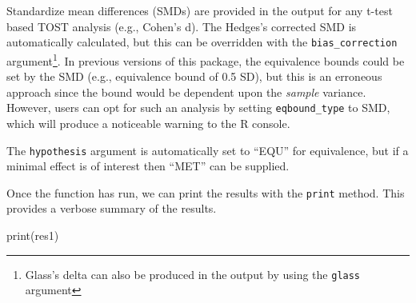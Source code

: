 \documentclass[]{interact}
\theoremstyle{plain}%
\theoremstyle{definition}
\theoremstyle{remark}
\newenvironment{Shaded}{\begin{snugshade}}{\end{snugshade}}
\newcommand{\AttributeTok}[1]{\textcolor[rgb]{0.77,0.63,0.00}{#1}}
\newcommand{\CommentTok}[1]{\textcolor[rgb]{0.56,0.35,0.01}{\textit{#1}}}
\newcommand{\DecValTok}[1]{\textcolor[rgb]{0.00,0.00,0.81}{#1}}
\newcommand{\FunctionTok}[1]{\textcolor[rgb]{0.00,0.00,0.00}{#1}}
\newcommand{\NormalTok}[1]{#1}
\newcommand{\OtherTok}[1]{\textcolor[rgb]{0.56,0.35,0.01}{#1}}
\newcommand{\SpecialCharTok}[1]{\textcolor[rgb]{0.00,0.00,0.00}{#1}}
\newcommand{\StringTok}[1]{\textcolor[rgb]{0.31,0.60,0.02}{#1}}
\begin{document}
Standardize mean differences (SMDs) are provided in the output for any
t-test based TOST analysis (e.g., Cohen's d). The Hedges's corrected SMD
\citep{hedges_bias} is automatically calculated, but this can be
overridden with the \texttt{bias\_correction} argument\footnote{Glass's
  delta can also be produced in the output by using the \texttt{glass}
  argument}. In previous versions of this package, the equivalence
bounds could be set by the SMD (e.g., equivalence bound of 0.5 SD), but
this is an erroneous approach since the bound would be dependent upon
the \emph{sample} variance. However, users can opt for such an analysis
by setting \texttt{eqbound\_type} to SMD, which will produce a
noticeable warning to the R console.

The \texttt{hypothesis} argument is automatically set to ``EQU'' for
equivalence, but if a minimal effect is of interest then ``MET'' can be
supplied.

\begin{Shaded}
\end{Shaded}

Once the function has run, we can print the results with the
\texttt{print} method. This provides a verbose summary of the results.

\begin{Shaded}
\begin{Highlighting}[]
\FunctionTok{print}\NormalTok{(res1)}
\end{Highlighting}
\end{Shaded}
\end{document}
